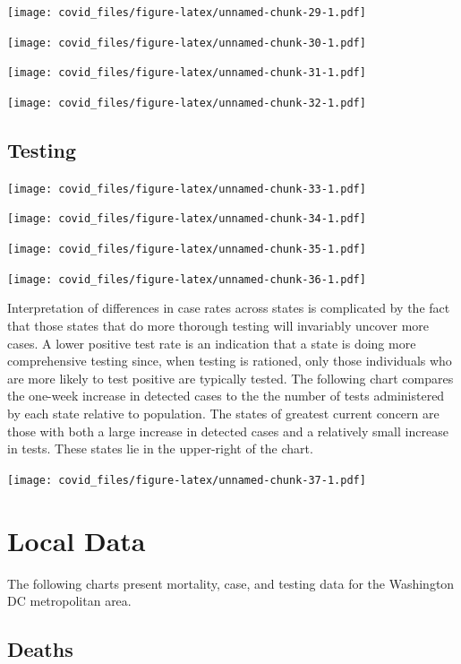 \documentclass[]{article}
\begin{document}
\texttt{[image: covid\_files/figure-latex/unnamed-chunk-29-1.pdf]}

\texttt{[image: covid\_files/figure-latex/unnamed-chunk-30-1.pdf]}
\newpage

\texttt{[image: covid\_files/figure-latex/unnamed-chunk-31-1.pdf]}

\texttt{[image: covid\_files/figure-latex/unnamed-chunk-32-1.pdf]}

\newpage

\hypertarget{testing-1}{%
\subsection{Testing}\label{testing-1}}

\texttt{[image: covid\_files/figure-latex/unnamed-chunk-33-1.pdf]}

\texttt{[image: covid\_files/figure-latex/unnamed-chunk-34-1.pdf]}

\newpage

\texttt{[image: covid\_files/figure-latex/unnamed-chunk-35-1.pdf]}

\texttt{[image: covid\_files/figure-latex/unnamed-chunk-36-1.pdf]}
\newpage

Interpretation of differences in case rates across states is complicated
by the fact that those states that do more thorough testing will
invariably uncover more cases. A lower positive test rate is an
indication that a state is doing more comprehensive testing since, when
testing is rationed, only those individuals who are more likely to test
positive are typically tested. The following chart compares the one-week
increase in detected cases to the the number of tests administered by
each state relative to population. The states of greatest current
concern are those with both a large increase in detected cases and a
relatively small increase in tests. These states lie in the upper-right
of the chart.

\texttt{[image: covid\_files/figure-latex/unnamed-chunk-37-1.pdf]}

\newpage

\hypertarget{local-data}{%
\section{Local Data}\label{local-data}}

The following charts present mortality, case, and testing data for the
Washington DC metropolitan area.

\hypertarget{deaths-2}{%
\subsection{Deaths}\label{deaths-2}}
\end{document}
